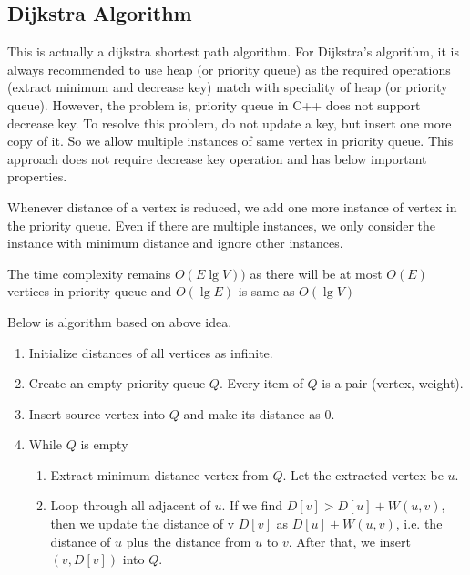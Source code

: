 \subsection{Dijkstra Algorithm}
This is actually a dijkstra shortest path algorithm. For Dijkstra's algorithm, it is always recommended to use heap (or priority queue) as the required operations (extract minimum and decrease key) match with speciality of heap (or priority queue). However, the problem is, priority queue in C++ does not support decrease key. To resolve this problem, do not update a key, but insert one more copy of it. So we allow multiple instances of same vertex in priority queue. This approach does not require decrease key operation and has below important properties.
\par
Whenever distance of a vertex is reduced, we add one more instance of vertex in the priority queue. Even if there are multiple instances, we only consider the instance with minimum distance and ignore other instances.
\par
The time complexity remains $O(E\lg V))$ as there will be at most $O(E)$ vertices in priority queue and $O(\lg E)$ is same as $O(\lg V)$
\par
Below is algorithm based on above idea.
\begin{enumerate}
    \item Initialize distances of all vertices as infinite.
    \item Create an empty priority queue $Q$.  Every item of $Q$ is a pair (vertex, weight). 
    \item Insert source vertex into $Q$ and make its distance as 0.
    \item While $Q$ is empty
    \begin{enumerate}
        \item Extract minimum distance vertex from $Q$. Let the extracted vertex be $u$.
        \item Loop through all adjacent of $u$. If we find $D[v] > D[u] + W(u, v)$, then we update the distance of v $D[v]$ as $D[u] + W(u,v)$, i.e. the distance of $u$ plus the distance from $u$ to $v$. After that, we insert $(v, D[v])$ into $Q$.
    \end{enumerate}
\end{enumerate}
